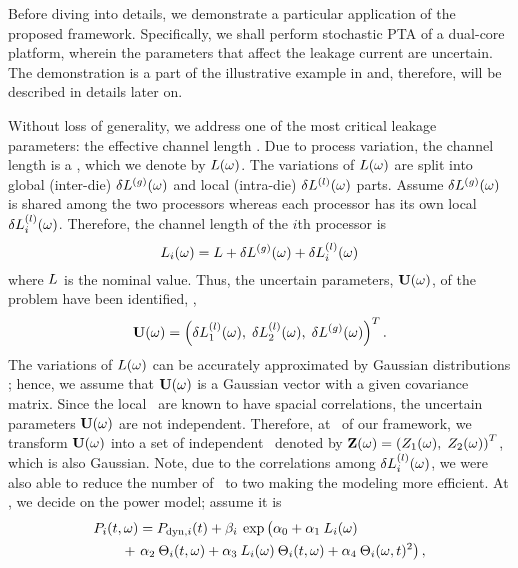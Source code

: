 Before diving into details, we demonstrate a particular application of the proposed framework. Specifically, we shall perform stochastic PTA of a dual-core platform, wherein the parameters that affect the leakage current are uncertain. The demonstration is a part of the illustrative example in  and, therefore, will be described in details later on.



Without loss of generality, we address one of the most critical leakage parameters: the effective channel length \cite{chandra2010, juan2011, juan2012, srivastava2010, shen2009}. Due to process variation, the channel length is a \rv, which we denote by $L(\omega)$. The variations of $L(\omega)$ are split into global (inter-die) ${\delta L^{(g)}}(\omega)$ and local (intra-die) $\delta L^{(l)}(\omega)$ parts. Assume ${\delta L^{(g)}}(\omega)$ is shared among the two processors whereas each processor has its own local \rv\ $\delta L^{(l)}_i(\omega)$. Therefore, the channel length of the $i$th processor is
\begin{equation} \elabel{leakage-partition}
  \Leff_i(\o) = \nLeff + \gLeff(\o) + \lLeff_i(\o)
\end{equation}
where $L$ is the nominal value. Thus, the uncertain parameters, $\mathbf{U}(\omega)$, of the problem have been identified, \ie,
\[
  \mathbf{U}(\omega) = \left(\delta L^{(l)}_1(\omega), \; \delta L^{(l)}_2(\omega), \; {\delta L^{(g)}}(\omega) \right)^T.
\]
The variations of $L(\omega)$ can be accurately approximated by Gaussian distributions \cite{juan2011, juan2012, srivastava2010}; hence, we assume that $\mathbf{U}(\omega)$ is a Gaussian vector with a given covariance matrix. Since the local \rvs\ are known to have spacial correlations, the uncertain parameters $\mathbf{U}(\omega)$ are not independent. Therefore, at \ of our framework, we transform $\mathbf{U}(\omega)$ into a set of independent \rvs\ denoted by $\mathbf{Z}(\omega) = \left(Z_1(\omega), \; Z_2(\omega)\right)^T$, which is also Gaussian. Note, due to the correlations among $\delta L^{(l)}_i(\omega)$, we were also able to reduce the number of \rvs\ to two making the modeling more efficient. At , we decide on the power model; assume it is
\begin{align*}
  & \P_i(\t, \o) = \P_{\dyn, i}(\t) + \beta_i \: \exp \left(\vphantom{\T^2_i} \alpha_0 + \alpha_1 \: \Leff_i(\o) \right. \\
  & \qquad {} + \left. \alpha_2 \: \T_i(\t, \o) + \alpha_3 \: \Leff_i(\o) \: \T_i(\t, \o) + \alpha_4 \: \T_i(\o, \t)^2 \right),
\end{align*}
